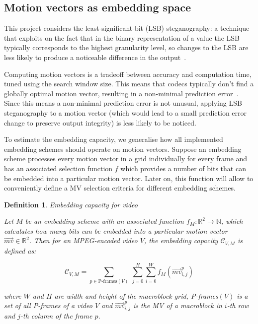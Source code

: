 \documentclass[12pt,british,twoside,notitlepage,usenames,dvipsnames,hypens,final]{report}
\newtheorem{definition}{Definition}
\numberwithin{equation}{section}
\numberwithin{figure}{section}
\begin{document}
\subsection{Motion vectors as embedding space}
\label{mv-emb-space}

This project considers the least-significant-bit (LSB) steganography: a technique that exploits on the fact that in the binary representation of a value the LSB typically corresponds to the highest granularity level, so changes to the LSB are less likely to produce a noticeable difference in the output~\cite{bateman}.

Computing motion vectors is a tradeoff between accuracy and computation time, tuned using the search window size. This means that codecs typically don't find a globally optimal motion vector, resulting in a non-minimal prediction error~\cite[p.~257]{richardson2004h}. Since this means a non-minimal prediction error is not unusual, applying LSB steganography to a motion vector (which would lead to a small prediction error change to preserve output integrity) is less likely to be noticed.

To estimate the embedding capacity, we generalise how all implemented embedding schemes should operate on motion vectors. Suppose an embedding scheme processes every motion vector in a grid individually for every frame and has an associated selection function $f$ which provides a number of bits that can be embedded into a particular motion vector. Later on, this function will allow to conveniently define a MV selection criteria for different embedding schemes.

\begin{definition}{Embedding capacity for video}

Let $M$ be an embedding scheme with an associated function $f_M : \mathbb{R}^2 \rightarrow \mathbb{N}$, which calculates how many bits can be embedded into a particular motion vector $\overrightarrow{mv} \in \mathbb{R}^2$. Then for an MPEG-encoded video $V$, the embedding capacity $\mathcal{C}_{V, M}$ is defined as:

$$ \mathcal{C}_{V, M} = \sum_{p \in \text{P-frames}(V)} \: \sum^{H}_{j = 0} \sum^{W}_{i = 0} f_M(\overrightarrow{mv}^p_{i, j})$$

where $W$ and $H$ are width and height of the macroblock grid, P-frames$(V)$ is a set of all P-frames of a video $V$ and $\overrightarrow{mv}^p_{i, j}$ is the MV of a macroblock  in $i$-th row and $j$-th column of the frame $p$.

\end{definition}
\end{document}
